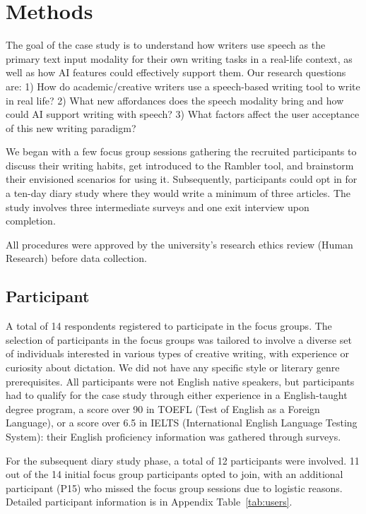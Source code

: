 \section{Methods}

The goal of the case study is to understand how writers use speech as the primary text input modality for their own writing tasks in a real-life context, as well as how AI features could effectively support them. 
Our research questions are: 1) How do academic/creative writers use a speech-based writing tool to write in real life? 2) What new affordances does the speech modality bring and how could AI support writing with speech? 3) What factors affect the user acceptance of this new writing paradigm?

We began with a few focus group sessions gathering the recruited participants to discuss their writing habits, get introduced to the Rambler tool, and brainstorm their envisioned scenarios for using it. Subsequently, participants could opt in for a ten-day diary study where they would write a minimum of three articles. The study involves three intermediate surveys and one exit interview upon completion.

All procedures were approved by the university’s research ethics review (Human Research) before data collection.

\subsection{Participant}

A total of 14 respondents registered to participate in the focus groups.
The selection of participants in the focus groups was tailored to involve a diverse set of individuals interested in various types of creative writing, with experience or curiosity about dictation. We did not have any specific style or literary genre prerequisites. All participants were not English native speakers, but participants had to qualify for the case study through either experience in a English-taught degree program, a score over 90 in TOEFL (Test of English as a Foreign Language), or a score over 6.5 in IELTS (International English Language Testing System): their English proficiency information was gathered through surveys.

For the subsequent diary study phase, a total of 12 participants were involved. 11 out of the 14 initial focus group participants opted to join, with an additional participant (P15) who missed the focus group sessions due to logistic reasons.
Detailed participant information is in Appendix Table~\ref{tab:users}.

